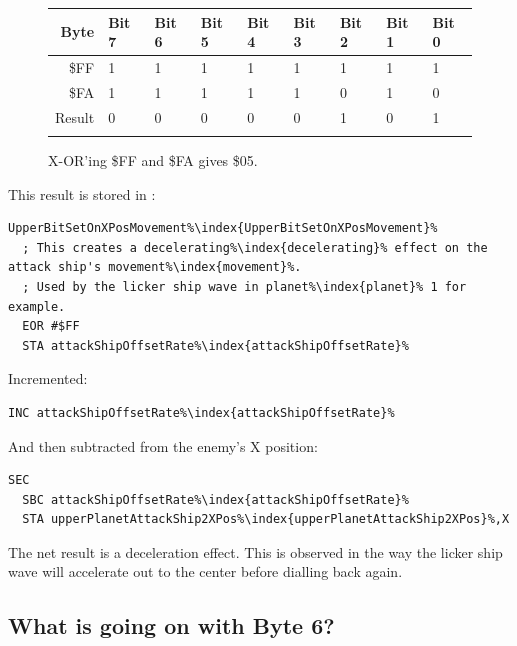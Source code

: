 \begin{figure}[H]
  {
    \setlength{\tabcolsep}{3.0pt}
    \setlength\cmidrulewidth{\heavyrulewidth} %
    \begin{adjustbox}{width=7cm,center}

      \begin{tabular}{rllllllll}
        \toprule
        Byte & Bit 7 & Bit 6 & Bit 5 & Bit 4 & Bit 3 & Bit 2 & Bit 1 & Bit 0        \\
        \midrule
        \$FF & 1 & 1 & 1 & 1 & 1 & 1 & 1 & 1 \\
        \$FA & 1 & 1 & 1 & 1 & 1 & 0 & 1 & 0 \\
        \midrule
        Result & 0 & 0 & 0 & 0 & 0 & 1 & 0 & 1 \\
        \addlinespace
        \bottomrule
      \end{tabular}

    \end{adjustbox}

    }\caption*{X-OR'ing \$FF and \$FA gives \$05.}
\end{figure}

This result is stored in :
\begin{lstlisting}[escapechar=\%]
UpperBitSetOnXPosMovement%\index{UpperBitSetOnXPosMovement}%   
  ; This creates a decelerating%\index{decelerating}% effect on the attack ship's movement%\index{movement}%.
  ; Used by the licker ship wave in planet%\index{planet}% 1 for example.
  EOR #$FF
  STA attackShipOffsetRate%\index{attackShipOffsetRate}%
\end{lstlisting}

Incremented:
\begin{lstlisting}[escapechar=\%]
        INC attackShipOffsetRate%\index{attackShipOffsetRate}%
\end{lstlisting}

And then subtracted from the enemy's X position:
\begin{lstlisting}[escapechar=\%]
  SEC
  SBC attackShipOffsetRate%\index{attackShipOffsetRate}%
  STA upperPlanetAttackShip2XPos%\index{upperPlanetAttackShip2XPos}%,X
\end{lstlisting}

The net result is a deceleration effect. This is observed in the way the licker ship
wave will accelerate out to the center before dialling back again.


\subsection{What is going on with Byte 6?}

